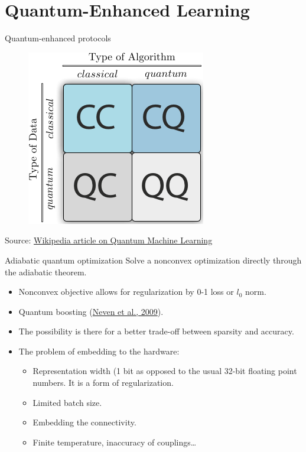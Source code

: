 \documentclass[compress]{beamer}\usetheme{Warsaw}\usecolortheme{crane}\useoutertheme[subsection=false]{smoothbars}
\begin{document}
\section{Quantum-Enhanced Learning}
\begin{frame}{Quantum-enhanced protocols}
\begin{figure}
	\includegraphics[height=.7\textheight]{Qml_approaches.png}
\end{figure}
Source: \href{https://en.wikipedia.org/wiki/Quantum_machine_learning}{Wikipedia article on Quantum Machine Learning}
\end{frame}

\begin{frame}{Adiabatic quantum optimization}
Solve a nonconvex optimization directly through the adiabatic theorem.
  \begin{itemize}
  	\item Nonconvex objective allows for regularization by 0-1 loss or $l_0$ norm.
  	\item Quantum boosting (\href{https://www.google.com/googleblogs/pdfs/nips_demoreport_120709_research.pdf}{Neven et al., 2009}).
  	\item The possibility is there for a better trade-off between sparsity and accuracy.
  	\item The problem of embedding to the hardware: 
  	\begin{itemize}
  		\item Representation width (1 bit as opposed to the usual 32-bit floating point numbers. It is a form of regularization.
  		\item Limited batch size.
  		\item Embedding the connectivity.
  		\item Finite temperature, inaccuracy of couplings\ldots
  	\end{itemize}
  \end{itemize}
\end{frame}
\end{document}
